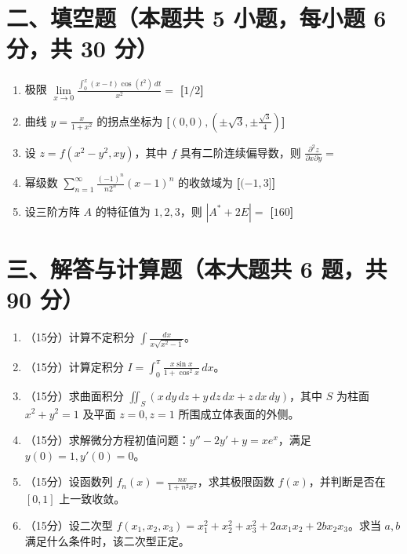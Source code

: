 \documentclass[a4paper,11pt]{article}
\newcommand{\xzanswer}[1]{\hfill\textbf{[#1]}}
\begin{document}
\section*{二、填空题（本题共 5 小题，每小题 6 分，共 30 分）}
\begin{enumerate}[label=\arabic*., leftmargin=1.5em]
  \item 极限 $\lim\limits_{x\to 0}\frac{\int_0^x (x-t)\cos(t^2)\,dt}{x^2} = $ \underline{\hspace{2cm}} \xzanswer{$1/2$}
  \item 曲线 $y=\frac{x}{1+x^2}$ 的拐点坐标为 \underline{\hspace{2cm}} \xzanswer{$(0,0), (\pm\sqrt{3}, \pm\frac{\sqrt{3}}{4})$}
  \item 设 $z=f(x^2-y^2, xy)$，其中 $f$ 具有二阶连续偏导数，则 $\frac{\partial^2 z}{\partial x\partial y} = $ \underline{\hspace{2cm}}
  \item 幂级数 $\sum\limits_{n=1}^\infty \frac{(-1)^n}{n 2^n} (x-1)^n$ 的收敛域为 \underline{\hspace{2cm}} \xzanswer{$(-1, 3]$}
  \item 设三阶方阵 $A$ 的特征值为 $1, 2, 3$，则 $|A^*+2E| = $ \underline{\hspace{2cm}} \xzanswer{$160$}
\end{enumerate}

\section*{三、解答与计算题（本大题共 6 题，共 90 分）}
\begin{enumerate}[label=\arabic*., leftmargin=1.5em]
  \item（15分）计算不定积分 $\int \frac{dx}{x\sqrt{x^2-1}}$。
  \item（15分）计算定积分 $I = \int_0^\pi \frac{x\sin x}{1+\cos^2 x}\,dx$。
  \item（15分）求曲面积分 $\iint_S (x\,dy\,dz + y\,dz\,dx + z\,dx\,dy)$，其中 $S$ 为柱面 $x^2+y^2=1$ 及平面 $z=0, z=1$ 所围成立体表面的外侧。
  \item（15分）求解微分方程初值问题：$y'' - 2y' + y = xe^x$，满足 $y(0)=1, y'(0)=0$。
  \item（15分）设函数列 $f_n(x) = \frac{nx}{1+n^2 x^2}$，求其极限函数 $f(x)$，并判断是否在 $[0,1]$ 上一致收敛。
  \item（15分）设二次型 $f(x_1, x_2, x_3) = x_1^2 + x_2^2 + x_3^2 + 2a x_1 x_2 + 2b x_2 x_3$。求当 $a, b$ 满足什么条件时，该二次型正定。
\end{enumerate}
\end{document}
